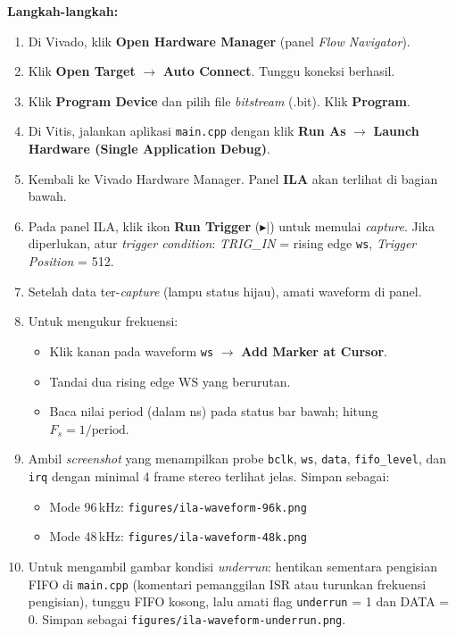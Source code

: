 \textbf{Langkah-langkah:}
\begin{enumerate}
\item Di Vivado, klik \textbf{Open Hardware Manager} (panel \textit{Flow Navigator}).
\item Klik \textbf{Open Target} $\to$ \textbf{Auto Connect}. Tunggu koneksi berhasil.
\item Klik \textbf{Program Device} dan pilih file \textit{bitstream} (.bit).
      Klik \textbf{Program}.
\item Di Vitis, jalankan aplikasi \texttt{main.cpp} dengan klik \textbf{Run As} $\to$
      \textbf{Launch Hardware (Single Application Debug)}.
\item Kembali ke Vivado Hardware Manager. Panel \textbf{ILA} akan terlihat di bagian bawah.
\item Pada panel ILA, klik ikon \textbf{Run Trigger} ($\blacktriangleright|$) untuk
      memulai \textit{capture}. Jika diperlukan, atur \textit{trigger condition}:
      \textit{TRIG\_IN} = rising edge \texttt{ws}, \textit{Trigger Position} = 512.
\item Setelah data ter-\textit{capture} (lampu status hijau), amati waveform di panel.
\item Untuk mengukur frekuensi:
      \begin{itemize}
      \item Klik kanan pada waveform \texttt{ws} $\to$ \textbf{Add Marker at Cursor}.
      \item Tandai dua rising edge WS yang berurutan.
      \item Baca nilai period (dalam ns) pada status bar bawah; hitung
            $F_s = 1 / \text{period}$.
      \end{itemize}
\item Ambil \textit{screenshot} yang menampilkan probe \texttt{bclk}, \texttt{ws},
      \texttt{data}, \texttt{fifo\_level}, dan \texttt{irq} dengan minimal 4 frame
      stereo terlihat jelas. Simpan sebagai:
      \begin{itemize}
      \item Mode 96\,kHz: \texttt{figures/ila-waveform-96k.png}
      \item Mode 48\,kHz: \texttt{figures/ila-waveform-48k.png}
      \end{itemize}
\item Untuk mengambil gambar kondisi \textit{underrun}: hentikan sementara pengisian
      FIFO di \texttt{main.cpp} (komentari pemanggilan ISR atau turunkan frekuensi
      pengisian), tunggu FIFO kosong, lalu amati flag \texttt{underrun} = 1 dan
      DATA = 0. Simpan sebagai \texttt{figures/ila-waveform-underrun.png}.
\end{enumerate}

